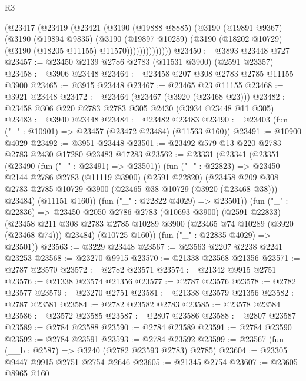 \begin{lexlean}{R3}
\begin{coremodule}
              (@23417
                (@23419
                  (@23421
                    (@3190
                      (@19888 @8885)
                      (@3190
                        (@19891 @9367)
                        (@3190
                          (@19894 @9835)
                          (@3190
                            (@19897 @10289)
                            (@3190 (@18202 @10729) (@3190 (@18205 @11155) @11570))))))))))))))
@23450 := @3893 @23448 @727
@23457 := @23450 @2139 @2786 @2783 (@11531 @3900) (@2591 @23357)
@23458 := @3906 @23448
@23464 := @23458 @207 @308 @2783 @2785 @11155 @3900
@23465 := @3915 @23448
@23467 := @23465 @23 @11155
@23468 := @3921 @23448
@23472 := @23464 (@23467 (@3920 (@23468 @23)))
@23482 := @23458 @306 @220 @2783 @2783 @305 @2430 (@3934 @23448 @11 @305)
@23483 := @3940 @23448
@23484 := @23482 @23483
@23490 := @23403 (fun ("_" : @10901) => @23457 (@23472 @23484) (@11563 @160))
@23491 := @10900 @4029
@23492 := @3951 @23448
@23501 := @23492 @579 @13 @220 @2783 @2783 @2430 @17280 @23483 @17283
@23562 := @23331
    (@23341
      (@23351
        (@23490 (fun ("_" : @23491) => @23501))
        (fun ("_" : @22823) =>
        @23450
          @2144
          @2786
          @2783
          (@11119 @3900)
          (@2591 @22820)
          (@23458
            @209
            @308
            @2783
            @2785
            @10729
            @3900
            (@23465 @38 @10729 (@3920 (@23468 @38)))
            @23484)
          (@11151 @160))
        (fun ("_" : @22822 @4029) => @23501))
      (fun ("_" : @22836) =>
      @23450
        @2050
        @2786
        @2783
        (@10693 @3900)
        (@2591 @22833)
        (@23458 @211 @308 @2783 @2785 @10289 @3900 (@23465 @74 @10289 (@3920 (@23468 @74))) @23484)
        (@10725 @160))
      (fun ("_" : @22835 @4029) => @23501))
@23563 := @3229 @23448
@23567 := @23563 @2207 @2238 @2241 @23253
@23568 := @23270 @9915
@23570 := @21338 @23568 @21356
@23571 := @2787 @23570
@23572 := @2782 @23571
@23574 := @21342 @9915 @2751
@23576 := @21338 @23574 @21356
@23577 := @2787 @23576
@23578 := @2782 @23577
@23579 := @23270 @2751
@23581 := @21338 @23579 @21356
@23582 := @2787 @23581
@23584 := @2782 @23582 @2783
@23585 := @23578 @23584
@23586 := @23572 @23585
@23587 := @2807 @23586
@23588 := @2807 @23587
@23589 := @2784 @23588
@23590 := @2784 @23589
@23591 := @2784 @23590
@23592 := @2784 @23591
@23593 := @2784 @23592
@23599 := @23567 (fun (__b : @2587) => @3240 (@2782 @23593 @2783) @2785)
@23604 := @23305 @9447 @9915 @2751 @2754 @2646
@23605 := @21345 @2754
@23607 := @23605 @8965 @160

\end{coremodule}
\end{lexlean}
